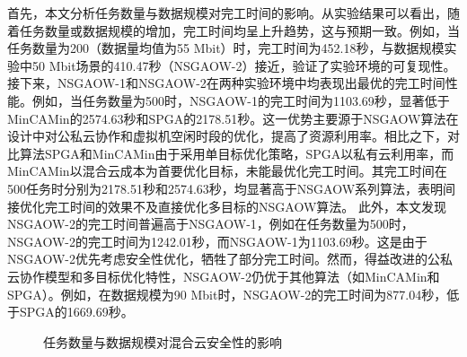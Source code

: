 
首先，本文分析任务数量与数据规模对完工时间的影响。从实验结果可以看出，随着任务数量或数据规模的增加，完工时间均呈上升趋势，这与预期一致。例如，当任务数量为200（数据量均值为55 Mbit）时，完工时间为452.18秒，与数据规模实验中50 Mbit场景的410.47秒（NSGAOW-2）接近，验证了实验环境的可复现性。
接下来，NSGAOW-1和NSGAOW-2在两种实验环境中均表现出最优的完工时间性能。例如，当任务数量为500时，NSGAOW-1的完工时间为1103.69秒，显著低于MinCAMin的2574.63秒和SPGA的2178.51秒。这一优势主要源于NSGAOW算法在设计中对公私云协作和虚拟机空闲时段的优化，提高了资源利用率。相比之下，对比算法SPGA和MinCAMin由于采用单目标优化策略，SPGA以私有云利用率，而MinCAMin以混合云成本为首要优化目标，未能最优化完工时间。其完工时间在500任务时分别为2178.51秒和2574.63秒，均显著高于NSGAOW系列算法，表明间接优化完工时间的效果不及直接优化多目标的NSGAOW算法。
此外，本文发现NSGAOW-2的完工时间普遍高于NSGAOW-1，例如在任务数量为500时，NSGAOW-2的完工时间为1242.01秒，而NSGAOW-1为1103.69秒。这是由于NSGAOW-2优先考虑安全性优化，牺牲了部分完工时间。然而，得益改进的公私云协作模型和多目标优化特性，NSGAOW-2仍优于其他算法（如MinCAMin和SPGA）。例如，在数据规模为90 Mbit时，NSGAOW-2的完工时间为877.04秒，低于SPGA的1669.69秒。

\begin{figure}[htb]
    \caption{任务数量与数据规模对混合云安全性的影响}\label{fig:task_amount_vs_security}
\end{figure}

